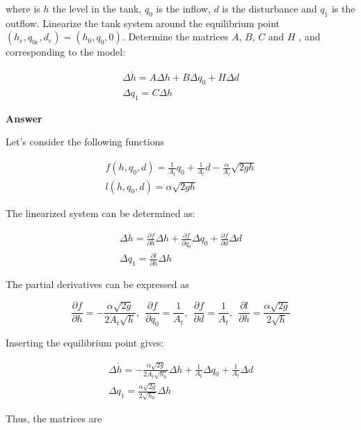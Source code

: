 where is $h$ the level in the tank, $q_0$ is the inflow, $d$ is the disturbance and $q_1$ is the outflow.
Linearize the tank system around the equilibrium point $(h_e, q_{0e}, d_e) = (h_0, q_0, 0)$. Determine the matrices $A$, $B$, $C$ and $H$ , and corresponding to the model:

\begin{eqnarray}
\Delta \dot{h} = A \Delta h + B \Delta q_0 + H \Delta d  \nonumber \\
\Delta q_1 = C \Delta h \nonumber  
\end{eqnarray}

\textbf{Answer}

Let's consider the following functions

\begin{eqnarray}
f(h,q_0,d) = \frac{1}{A_t}q_0 + \frac{1}{A_t}d - \frac{\alpha}{A_t}\sqrt{2gh} \nonumber \\
l(h, q_0, d) = \alpha \sqrt{2gh}   \nonumber
\end{eqnarray}

The linearized system can be determined as: 

\begin{eqnarray}
\Delta \dot{h} = \frac{\partial f}{\partial h} \Delta h + \frac{\partial f}{\partial q_0} \Delta q_0 + \frac{\partial f}{\partial d} \Delta d  \nonumber \\
\Delta q_1 = \frac{\partial l}{\partial h} \Delta h   \nonumber
\end{eqnarray}

The partial derivatives can be expressed as 

\begin{equation}
\frac{\partial f}{\partial h} = -\frac{\alpha \sqrt{2g}}{2A_t\sqrt{h}}, ~~ \frac{\partial f}{\partial q_0} = \frac{1}{A_t}, ~~ \frac{\partial f}{\partial d} = \frac{1}{A_t}, ~~ \frac{\partial l}{\partial h} = \frac{\alpha \sqrt{2g}}{2\sqrt{h}}    \nonumber
\end{equation}

Inserting the equilibrium point gives: 

\begin{eqnarray}
\Delta \dot{h} = -\frac{\alpha \sqrt{2g}}{2A_t\sqrt{h_0}} \Delta h + \frac{1}{A_t} \Delta q_0 + \frac{1}{A_t} \Delta d  \nonumber \\
\Delta q_1 = \frac{\alpha \sqrt{2g}}{2\sqrt{h_0}} \Delta h   \nonumber
\end{eqnarray}

Thus, the matrices are

